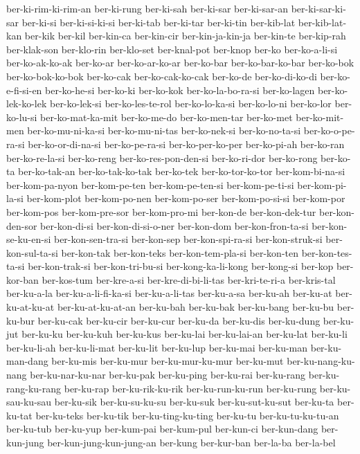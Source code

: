 {ber-ki-rim-ki-rim-an ber-ki-rung ber-ki-sah ber-ki-sar ber-ki-sar-an
ber-ki-sar-ki-sar ber-ki-si ber-ki-si-ki-si ber-ki-tab ber-ki-tar
ber-ki-tin ber-kib-lat ber-kib-lat-kan ber-kik ber-kil ber-kin-ca
ber-kin-cir ber-kin-ja-kin-ja ber-kin-te ber-kip-rah ber-klak-son
ber-klo-rin ber-klo-set ber-knal-pot ber-knop ber-ko ber-ko-a-li-si
ber-ko-ak-ko-ak ber-ko-ar ber-ko-ar-ko-ar ber-ko-bar ber-ko-bar-ko-bar
ber-ko-bok ber-ko-bok-ko-bok ber-ko-cak ber-ko-cak-ko-cak ber-ko-de
ber-ko-di-ko-di ber-ko-e-fi-si-en ber-ko-he-si ber-ko-ki ber-ko-kok
ber-ko-la-bo-ra-si ber-ko-lagen ber-ko-lek-ko-lek ber-ko-lek-si
ber-ko-les-te-rol ber-ko-lo-ka-si ber-ko-lo-ni ber-ko-lor ber-ko-lu-si
ber-ko-mat-ka-mit ber-ko-me-do ber-ko-men-tar ber-ko-met ber-ko-mit-men
ber-ko-mu-ni-ka-si ber-ko-mu-ni-tas ber-ko-nek-si ber-ko-no-ta-si
ber-ko-o-pe-ra-si ber-ko-or-di-na-si ber-ko-pe-ra-si ber-ko-per-ko-per
ber-ko-pi-ah ber-ko-ran ber-ko-re-la-si ber-ko-reng ber-ko-res-pon-den-si
ber-ko-ri-dor ber-ko-rong ber-ko-ta ber-ko-tak-an ber-ko-tak-ko-tak
ber-ko-tek ber-ko-tor-ko-tor ber-kom-bi-na-si ber-kom-pa-nyon
ber-kom-pe-ten ber-kom-pe-ten-si ber-kom-pe-ti-si ber-kom-pi-la-si
ber-kom-plot ber-kom-po-nen ber-kom-po-ser ber-kom-po-si-si ber-kom-por
ber-kom-pos ber-kom-pre-sor ber-kom-pro-mi ber-kon-de ber-kon-dek-tur
ber-kon-den-sor ber-kon-di-si ber-kon-di-si-o-ner ber-kon-dom
ber-kon-fron-ta-si ber-kon-se-ku-en-si ber-kon-sen-tra-si ber-kon-sep
ber-kon-spi-ra-si ber-kon-struk-si ber-kon-sul-ta-si ber-kon-tak
ber-kon-teks ber-kon-tem-pla-si ber-kon-ten ber-kon-tes-ta-si
ber-kon-trak-si ber-kon-tri-bu-si ber-kong-ka-li-kong ber-kong-si ber-kop
ber-kor-ban ber-kos-tum ber-kre-a-si ber-kre-di-bi-li-tas ber-kri-te-ri-a
ber-kris-tal ber-ku-a-la ber-ku-a-li-fi-ka-si ber-ku-a-li-tas ber-ku-a-sa
ber-ku-ah ber-ku-at ber-ku-at-ku-at ber-ku-at-ku-at-an ber-ku-bah
ber-ku-bak ber-ku-bang ber-ku-bu ber-ku-bur ber-ku-cak ber-ku-cir
ber-ku-cur ber-ku-da ber-ku-dis ber-ku-dung ber-ku-jut ber-ku-ku
ber-ku-kuh ber-ku-kus ber-ku-lai ber-ku-lai-an ber-ku-lat ber-ku-li
ber-ku-li-ah ber-ku-li-mat ber-ku-lit ber-ku-lup ber-ku-mai ber-ku-man
ber-ku-man-dang ber-ku-mis ber-ku-mur ber-ku-mur-ku-mur ber-ku-mut
ber-ku-nang-ku-nang ber-ku-nar-ku-nar ber-ku-pak ber-ku-ping ber-ku-rai
ber-ku-rang ber-ku-rang-ku-rang ber-ku-rap ber-ku-rik-ku-rik
ber-ku-run-ku-run ber-ku-rung ber-ku-sau-ku-sau ber-ku-sik ber-ku-su-ku-su
ber-ku-suk ber-ku-sut-ku-sut ber-ku-ta ber-ku-tat ber-ku-teks ber-ku-tik
ber-ku-ting-ku-ting ber-ku-tu ber-ku-tu-ku-tu-an ber-ku-tub ber-ku-yup
ber-kum-pai ber-kum-pul ber-kun-ci ber-kun-dang ber-kun-jung
ber-kun-jung-kun-jung-an ber-kung ber-kur-ban ber-la-ba ber-la-bel
}
